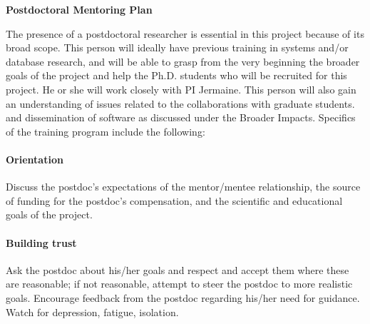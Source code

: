 
\begin{center}
\textbf{Postdoctoral Mentoring Plan}
\end{center}

The presence of a postdoctoral researcher is essential in this project
because of its broad scope. This person will ideally have previous
training in systems and/or database research, 
and will be
able to grasp from the very beginning the broader goals of the project
and help the Ph.D. students who will be recruited for this
project. 
He or she will work closely with PI Jermaine.
This person will also gain an
understanding of issues related to the collaborations with graduate students.
and dissemination of software as discussed under the Broader Impacts.
Specifics of the training program include the following:

\vspace{-5pt}\paragraph{Orientation}
Discuss the postdoc's expectations of the mentor/mentee relationship, the source of funding for the postdoc's compensation, and the scientific and educational goals of the 
project.  
\vspace{-5pt}\paragraph{Building trust}
Ask the postdoc about his/her goals and respect and accept them where
these are reasonable; if not reasonable, attempt to steer the postdoc to
more realistic goals.  
Encourage feedback from the postdoc regarding his/her need for guidance.
Watch for depression, fatigue, isolation.

